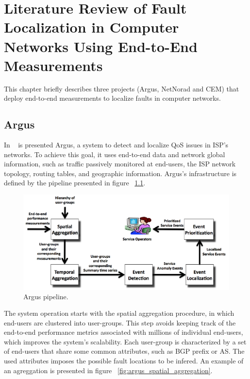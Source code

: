 \chapter{Literature Review of Fault Localization in Computer Networks Using
End-to-End Measurements}

This chapter briefly describes three projects (Argus, NetNorad and CEM)
that deploy end-to-end measurements to localize faults in computer networks.

\section{Argus}

In
~\cite{argus_end_to_end_service_anomaly_detection_and_localization_from_an_isps_point_of_view}
is presented Argus, a system to
detect and localize QoS issues in ISP's networks. To achieve this goal, it uses
end-to-end data and network global information, such as
traffic passively monitored at end-users, the ISP network topology,
routing tables, and geographic information. Argus's infrastructure is defined by
the pipeline presented in figure ~\ref{fig:argus_pipeline}.

\begin{figure}[H]
    \centering
    \includegraphics[width=1.0\textwidth]{./figures/literature_review/argus_pipeline.png}
    \caption{Argus pipeline.}
    \label{fig:argus_pipeline}
\end{figure}%

The system operation starts with the spatial aggregation procedure, in which
end-users are clustered into user-groups. This step avoids keeping
track of the end-to-end performance metrics associated with millions of
individual end-users, which improves the system's scalability.
Each user-group is characterized by a set of end-users that share some common
attributes, such as BGP prefix or AS. The used attributes imposes the possible
fault locations to be infered.
An example of an agreggation is presented in figure
~\ref{fig:argus_spatial_aggregation}.

